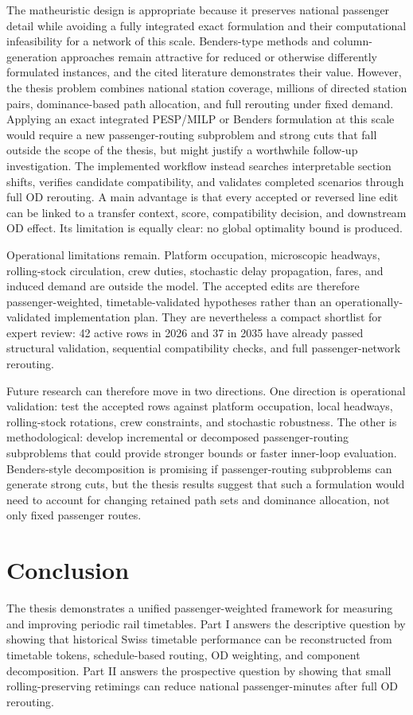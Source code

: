 \documentclass[conference]{IEEEtran}
\begin{document}
The matheuristic design is appropriate because it preserves national passenger detail while avoiding a fully integrated exact formulation and their computational infeasibility for a network of this scale. Benders-type methods and column-generation approaches remain attractive for reduced or otherwise differently formulated instances, and the cited literature demonstrates their value. However, the thesis problem combines national station coverage, millions of directed station pairs, dominance-based path allocation, and full rerouting under fixed demand. Applying an exact integrated PESP/MILP or Benders formulation at this scale would require a new passenger-routing subproblem and strong cuts that fall outside the scope of the thesis, but might justify a worthwhile follow-up investigation. The implemented workflow instead searches interpretable section shifts, verifies candidate compatibility, and validates completed scenarios through full OD rerouting. A main advantage is that every accepted or reversed line edit can be linked to a transfer context, score, compatibility decision, and downstream OD effect. Its limitation is equally clear: no global optimality bound is produced.

Operational limitations remain. Platform occupation, microscopic headways, rolling-stock circulation, crew duties, stochastic delay propagation, fares, and induced demand are outside the model. The accepted edits are therefore passenger-weighted, timetable-validated hypotheses rather than an operationally-validated implementation plan. They are nevertheless a compact shortlist for expert review: 42 active rows in 2026 and 37 in 2035 have already passed structural validation, sequential compatibility checks, and full passenger-network rerouting.

Future research can therefore move in two directions. One direction is operational validation: test the accepted rows against platform occupation, local headways, rolling-stock rotations, crew constraints, and stochastic robustness. The other is methodological: develop incremental or decomposed passenger-routing subproblems that could provide stronger bounds or faster inner-loop evaluation. Benders-style decomposition is promising if passenger-routing subproblems can generate strong cuts, but the thesis results suggest that such a formulation would need to account for changing retained path sets and dominance allocation, not only fixed passenger routes.

\section{Conclusion}
The thesis demonstrates a unified passenger-weighted framework for measuring and improving periodic rail timetables. Part I answers the descriptive question by showing that historical Swiss timetable performance can be reconstructed from timetable tokens, schedule-based routing, OD weighting, and component decomposition. Part II answers the prospective question by showing that small rolling-preserving retimings can reduce national passenger-minutes after full OD rerouting.
\end{document}
